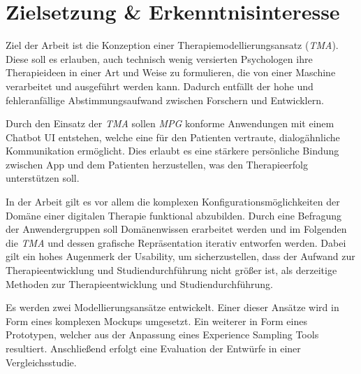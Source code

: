 
\section{Zielsetzung \& Erkenntnisinteresse}
\label{ch:Zielsetzung}


Ziel der Arbeit ist die Konzeption einer Therapiemodellierungsansatz (\emph{TMA}). Diese soll es erlauben, auch technisch wenig versierten Psychologen ihre Therapieideen in einer Art und Weise zu formulieren, die von einer Maschine verarbeitet und ausgeführt werden kann. Dadurch entfällt der hohe und fehleranfällige Abstimmungsaufwand zwischen Forschern und Entwicklern. 

Durch den Einsatz der \emph{TMA} sollen \emph{MPG} konforme Anwendungen mit einem Chatbot UI entstehen, welche eine für den Patienten vertraute, dialogähnliche Kommunikation ermöglicht. Dies erlaubt es eine stärkere persönliche Bindung zwischen App und dem Patienten herzustellen, was den Therapieerfolg unterstützen soll. 

In der Arbeit gilt es vor allem die komplexen Konfigurationsmöglichkeiten der Domäne einer digitalen Therapie funktional abzubilden. Durch eine Befragung der Anwendergruppen soll Domänenwissen erarbeitet werden und im Folgenden die \emph{TMA} und dessen grafische Repräsentation iterativ entworfen werden. Dabei gilt ein hohes Augenmerk der Usability, um sicherzustellen, dass der Aufwand zur Therapieentwicklung und Studiendurchführung nicht größer ist, als derzeitige Methoden zur Therapieentwicklung und Studiendurchführung.

Es werden zwei Modellierungsansätze entwickelt. Einer dieser Ansätze wird in Form eines komplexen Mockups umgesetzt. Ein weiterer in Form eines Prototypen, welcher aus der Anpassung eines Experience Sampling Tools resultiert. Anschließend erfolgt eine Evaluation der Entwürfe in einer Vergleichsstudie.
